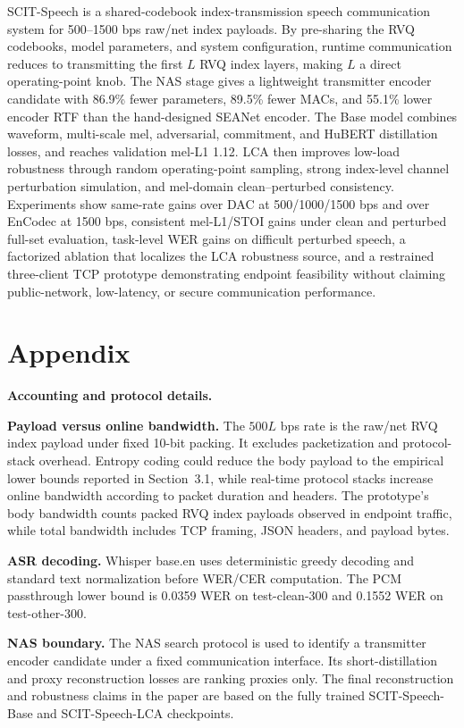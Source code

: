﻿\documentclass[conference]{IEEEtran}
\newcommand{\method}{SCIT-Speech}
\newcommand{\base}{SCIT-Speech-Base}
\newcommand{\lca}{SCIT-Speech-LCA}
\begin{document}
\method{} is a shared-codebook index-transmission speech communication system for 500--1500 bps raw/net index payloads. By pre-sharing the RVQ codebooks, model parameters, and system configuration, runtime communication reduces to transmitting the first \(L\) RVQ index layers, making \(L\) a direct operating-point knob. The NAS stage gives a lightweight transmitter encoder candidate with 86.9\% fewer parameters, 89.5\% fewer MACs, and 55.1\% lower encoder RTF than the hand-designed SEANet encoder. The Base model combines waveform, multi-scale mel, adversarial, commitment, and HuBERT distillation losses, and reaches validation mel-L1 1.12. LCA then improves low-load robustness through random operating-point sampling, strong index-level channel perturbation simulation, and mel-domain clean--perturbed consistency. Experiments show same-rate gains over DAC at 500/1000/1500 bps and over EnCodec at 1500 bps, consistent mel-L1/STOI gains under clean and perturbed full-set evaluation, task-level WER gains on difficult perturbed speech, a factorized ablation that localizes the LCA robustness source, and a restrained three-client TCP prototype demonstrating endpoint feasibility without claiming public-network, low-latency, or secure communication performance.




\appendix
\section*{Appendix}
\textbf{Accounting and protocol details.}

\textbf{Payload versus online bandwidth.}
The \(500L\) bps rate is the raw/net RVQ index payload under fixed 10-bit packing. It excludes packetization and protocol-stack overhead. Entropy coding could reduce the body payload to the empirical lower bounds reported in Section~3.1, while real-time protocol stacks increase online bandwidth according to packet duration and headers. The prototype's body bandwidth counts packed RVQ index payloads observed in endpoint traffic, while total bandwidth includes TCP framing, JSON headers, and payload bytes.

\textbf{ASR decoding.}
Whisper base.en uses deterministic greedy decoding and standard text normalization before WER/CER computation. The PCM passthrough lower bound is 0.0359 WER on test-clean-300 and 0.1552 WER on test-other-300.

\textbf{NAS boundary.}
The NAS search protocol is used to identify a transmitter encoder candidate under a fixed communication interface. Its short-distillation and proxy reconstruction losses are ranking proxies only. The final reconstruction and robustness claims in the paper are based on the fully trained \base{} and \lca{} checkpoints.
\end{document}
